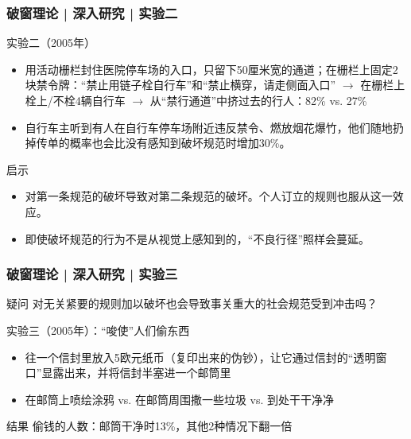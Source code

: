 \begin{frame}
  \frametitle{破窗理论 | 深入研究 | 实验二}
  \begin{block}{实验二（2005年）}
    \begin{itemize}
      \item 用活动栅栏封住医院停车场的入口，只留下50厘米宽的通道；在栅栏上固定2块禁令牌：“禁止用链子栓自行车”和“禁止横穿，请走侧面入口” $\rightarrow$ 在栅栏上栓上/不栓4辆自行车 $\rightarrow$ 从“禁行通道”中挤过去的行人：82\% vs. 27\%
      \item 自行车主听到有人在自行车停车场附近违反禁令、燃放烟花爆竹，他们随地扔掉传单的概率也会比没有感知到破坏规范时增加30\%。
    \end{itemize}
  \end{block}
  \pause
  \begin{block}{启示}
    \begin{itemize}
      \item 对第一条规范的破坏导致对第二条规范的破坏。个人订立的规则也服从这一效应。
      \item 即使破坏规范的行为不是从视觉上感知到的，“不良行径”照样会蔓延。
    \end{itemize}
  \end{block}
\end{frame}

\begin{frame}
  \frametitle{破窗理论 | 深入研究 | 实验三}
  \begin{block}{疑问}
 对无关紧要的规则加以破坏也会导致事关重大的社会规范受到冲击吗？ 
  \end{block}
  \pause
  \begin{block}{实验三（2005年）：“唆使”人们偷东西}
    \begin{itemize}
      \item 往一个信封里放入5欧元纸币（复印出来的伪钞），让它通过信封的“透明窗口”显露出来，并将信封半塞进一个邮筒里
      \item 在邮筒上喷绘涂鸦 vs. 在邮筒周围撒一些垃圾 vs. 到处干干净净
    \end{itemize}
  \end{block}
  \pause
  \begin{block}{结果}
    偷钱的人数：邮筒干净时13\%，其他2种情况下翻一倍
  \end{block}
\end{frame}

